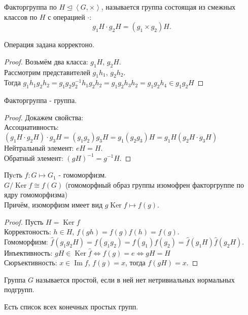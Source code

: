 \documentclass[11pt, oneside]{article}   	%
\DeclareMathOperator{\Ker}{Ker}
\DeclareMathOperator{\Ima}{Im}
\begin{document}
    \begin{definition}
        Факторгруппа по $H \unlhd \left<G, \times\right>$, называется группа состоящая из смежных классов по $H$ с операцией $\cdot $:
        \[ g_1H\cdot g_2H = (g_1 \times g_2)H .\] 
    \end{definition}
    \begin{dlemma}
        Операция задана корректоно.
        \begin{proof}
            Возьмём два класса: $g_1H$, $g_2H$.\\
            Рассмотрим представителей $g_1h_1$, $g_2h_2$.\\
            Тогда $g_1h_1g_2h_2 = g_1g_2g_2^{-1}h_1g_2h_2 = g_1g_2h_3h_2 = g_1g_2h_4\in g_1g_2H$
        \end{proof}
    \end{dlemma}
    \begin{dlemma}
        Факторгруппа - группа.
        \begin{proof} Докажем свойства:\\
            Ассоциативность: $(g_1H\cdot g_2H)\cdot g_3H = (g_1g_2)g_3H = g_1(g_2g_3)H = g_1H(g_2H\cdot g_3H)$
            Нейтральный элемент: $eH = H$.\\
            Обратный элемент: $(gH)^{-1} = g^{-1}H$.
        \end{proof}
    \end{dlemma}
    \begin{theorem}
        Пуcть $f: G \mapsto G_1$ - гомоморфизм.\\
        $G/\Ker f \cong f(G)$ (гомоморфный образ группы изомофрен факторгруппе по ядру гомоморфизма)\\
        Причём, изоморфизм имеет вид $g\Ker f \mapsto f(g)$.\\
        \begin{proof}
            Пусть $H=\Ker f$\\
            Корректоность: $h\in H$, $f(gh) = f(g)f(h) = f(g)$.\\
            Гомоморфизм: $\hat{f}(g_1g_2H) = f(g_1g_2) = f(g_1)f(g_2) = \hat{f}(g_1H)\hat{f}(g_2H)$.\\
            Инъективность: $gH\in \Ker \hat{f} \iff f(g) = e \iff gH = H$\\
            Сюръективность: $x\in \Ima f$, $f(g) = x$, тогда $f(gH) = x$.
        \end{proof}
    \end{theorem}
    \begin{definition}
        Группа $G$ называется простой, если в ней нет нетривиальных нормальных подгрупп.
    \end{definition}
    \begin{theorem}
        Есть список всех конечных простых групп.
    \end{theorem}
\end{document}
